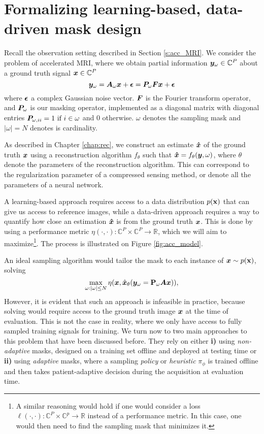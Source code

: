 \section{Formalizing learning-based, data-driven mask design}
Recall the observation setting described in Section \ref{s:acc_MRI}. We consider the problem of accelerated MRI, where we obtain partial information ${\bm{y}}_\omega \in \mathbb{C}^P$ about a ground truth signal ${\bm{x}} \in \mathbb{C}^P$
\begin{equation*}
{\bm{y}}_\omega = {\bm{A}}_\omega{\bm{x}} + \boldsymbol{\epsilon} ={\bm{P}}_\omega {\bm{F}} {\bm{x}} + \boldsymbol{\epsilon}
\end{equation*}
where $\boldsymbol{\epsilon}$ a complex Gaussian noise vector. ${\bm{F}}$  is the Fourier transform operator, and ${\bm{P}}_\omega$ is our masking operator, implemented as a diagonal matrix with diagonal entries ${\bm{P}}_{\omega,ii} = 1 \text{ if } i \in \omega$ and $0$ otherwise. $\omega$ denotes the sampling mask and $|\omega| = N$ denotes is cardinality.

As described in Chapter \ref{chap:rec}, we construct an estimate $\bm{\hat{x}}$ of the ground truth ${\bm{x}}$ using a reconstruction algorithm $f_\theta$ such that $\bm{\hat{x}} = f_\theta({\bm{y}}, \omega)$, where $\theta$ denote the parameters of the reconstruction algorithm. This can correspond to the regularization parameter of a compressed sensing method, or denote all the parameters of a neural network. 

A learning-based approach requires access to a data distribution $p({\mathbf{x}})$ that can give us access to reference images, while a data-driven approach requires a way to quantify how close an estimation $\bm{\hat{x}}$ is from the ground truth ${\bm{x}}$. This is done by using a performance metric $\eta(\cdot, \cdot): \mathbb{C}^P \times \mathbb{C}^P \to \mathbb{R}$, which we will aim to maximize\footnote{A similar reasoning would hold if one would consider a loss $\ell(\cdot, \cdot): \mathbb{C}^P \times \mathbb{C}^p \to \mathbb{R}$ instead of a performance metric. In this case, one would then need to find the sampling mask that minimizes it.}. The process is illustrated on Figure \ref{fig:acc_model}.

 An ideal sampling algorithm would tailor the mask to each instance of ${\bm{x}} \sim p({\mathbf{x}})$, solving
 \begin{equation}
     \max_{\omega: |\omega|\leq N} \eta({\bm{x}},\hat{{\bm{x}}}_\theta({\bm{y}}_{\omega}=\mathbf{P}_{\omega}{\bm{A}}{\bm{x}})), \label{eq:adaptive_long}
 \end{equation} 
 However, it is evident that such an approach is infeasible in practice, because solving  would require access to the ground truth image ${\bm{x}}$ at the time of evaluation. This is not the case in reality, where we only have access to fully sampled training signals for training. We turn now to two main approaches to this problem that have been discussed before. They rely on either \textbf{i)} using \textit{non-adaptive} masks, designed on a training set offline and deployed at testing time or \textbf{ii)} using \textit{adaptive} masks, where a sampling \textit{policy} or \textit{heuristic} $\pi_\phi$ is trained offline and then takes patient-adaptive decision during the acquisition at evaluation time.


